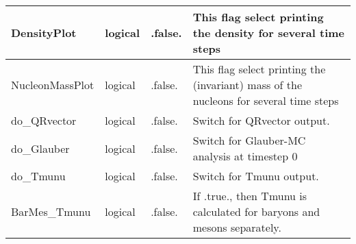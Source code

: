 \documentclass{article}
\begin{document}
\begin{longtable}{llll}
\midrule
DensityPlot & \begin{minipage}[t]{2cm}logical\end{minipage} & \begin{minipage}[t]{2cm}.false.\end{minipage} & \begin{minipage}[t]{12cm}This flag select printing the density for several time steps\end{minipage}\\*
\midrule
NucleonMassPlot & \begin{minipage}[t]{2cm}logical\end{minipage} & \begin{minipage}[t]{2cm}.false.\end{minipage} & \begin{minipage}[t]{12cm}This flag select printing the (invariant) mass of the nucleons for several time steps\end{minipage}\\*
\midrule
do\_QRvector & \begin{minipage}[t]{2cm}logical\end{minipage} & \begin{minipage}[t]{2cm}.false.\end{minipage} & \begin{minipage}[t]{12cm}Switch for QRvector output.\end{minipage}\\*
\midrule
do\_Glauber & \begin{minipage}[t]{2cm}logical\end{minipage} & \begin{minipage}[t]{2cm}.false.\end{minipage} & \begin{minipage}[t]{12cm}Switch for Glauber-MC analysis at timestep 0\end{minipage}\\*
\midrule
do\_Tmunu & \begin{minipage}[t]{2cm}logical\end{minipage} & \begin{minipage}[t]{2cm}.false.\end{minipage} & \begin{minipage}[t]{12cm}Switch for Tmunu output.\end{minipage}\\*
\midrule
BarMes\_Tmunu & \begin{minipage}[t]{2cm}logical\end{minipage} & \begin{minipage}[t]{2cm}.false.\end{minipage} & \begin{minipage}[t]{12cm}If .true., then Tmunu is calculated for baryons and mesons separately.\end{minipage}\\*

\end{longtable}
\end{document}
